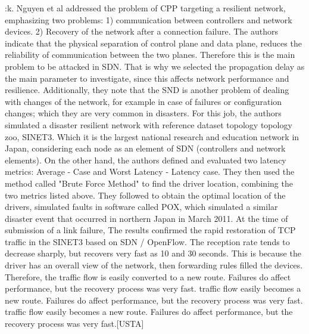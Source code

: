 \documentclass[a4paper,10pt]{article}
\begin{document}
\cite{NgMi13}:k. Nguyen et al addressed the problem of CPP targeting a resilient network, emphasizing two problems: 1) communication between controllers and network devices. 2) Recovery of the network after a connection failure. The authors indicate that the physical separation of control plane and data plane, reduces the reliability of communication between the two planes. Therefore this is the main problem to be attacked in SDN. That is why we selected the propagation delay as the main parameter to investigate, since this affects network performance and resilience. Additionally, they note that the SND is another problem of dealing with changes of the network, for example in case of failures or configuration changes; which they are very common in disasters. For this job, the authors simulated a disaster resilient network with reference dataset topology topology zoo, SINET3. Which it is the largest national research and education network in Japan, considering each node as an element of SDN (controllers and network elements). On the other hand, the authors defined and evaluated two latency metrics: Average - Case and Worst Latency - Latency case. They then used the method called "Brute Force Method" to find the driver location, combining the two metrics listed above. They followed to obtain the optimal location of the drivers, simulated faults in software called POX, which simulated a similar disaster event that occurred in northern Japan in March 2011. At the time of submission of a link failure, The results confirmed the rapid restoration of TCP traffic in the SINET3 based on SDN / OpenFlow. The reception rate tends to decrease sharply, but recovers very fast as 10 and 30 seconds. This is because the driver has an overall view of the network, then forwarding rules filled the devices. Therefore, the traffic flow is easily converted to a new route. Failures do affect performance, but the recovery process was very fast. traffic flow easily becomes a new route. Failures do affect performance, but the recovery process was very fast. traffic flow easily becomes a new route. Failures do affect performance, but the recovery process was very fast.[USTA]
\end{document}
